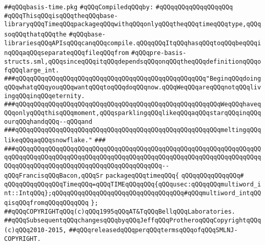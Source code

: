 \label{src/lib/std/types-only/basis-time.pkg}
\verb|##qQQqbasis-time.pkg|\newline
\newline
\verb|#qQQqCompiledqQQqby:|\newline
\verb|#qQQqqQQqqQQqqQQqqQQq|\newline
\newline
\verb|#qQQqThisqQQqisqQQqtheqQQqbase-libraryqQQqTimeqQQqpackageqQQqwithqQQqonlyqQQqtheqQQqtimeqQQqtype,qQQqsoqQQqthatqQQqthe|\newline
\verb|#qQQqbase-librariesqQQqAPIsqQQqcanqQQqcompile.qQQqqQQqItqQQqhasqQQqtoqQQqbeqQQqinqQQqaqQQqseparateqQQqfileqQQqfrom|\newline
\verb|#qQQqpre-basis-structs.sml,qQQqsinceqQQqitqQQqdependsqQQqonqQQqtheqQQqdefinitionqQQqofqQQqlarge_int.|\newline
\newline
\newline
\verb|###qQQqqQQqqQQqqQQqqQQqqQQqqQQqqQQqqQQqqQQqqQQqqQQqqQQq"BeginqQQqdoingqQQqwhatqQQqyouqQQqwantqQQqtoqQQqdoqQQqnow.qQQqWeqQQqareqQQqnotqQQqlivingqQQqinqQQqeternity.|\newline
\verb|###qQQqqQQqqQQqqQQqqQQqqQQqqQQqqQQqqQQqqQQqqQQqqQQqqQQqqQQqWeqQQqhaveqQQqonlyqQQqthisqQQqmoment,qQQqsparklingqQQqlikeqQQqaqQQqstarqQQqinqQQqourqQQqhandqQQq--qQQqand|\newline
\verb|###qQQqqQQqqQQqqQQqqQQqqQQqqQQqqQQqqQQqqQQqqQQqqQQqqQQqqQQqmeltingqQQqlikeqQQqaqQQqsnowflake."|\newline
\verb|###|\newline
\verb|###qQQqqQQqqQQqqQQqqQQqqQQqqQQqqQQqqQQqqQQqqQQqqQQqqQQqqQQqqQQqqQQqqQQqqQQqqQQqqQQqqQQqqQQqqQQqqQQqqQQqqQQqqQQqqQQqqQQqqQQqqQQqqQQqqQQqqQQqqQQqqQQqqQQqqQQqqQQqqQQqqQQqqQQqqQQqqQQqqQQq--qQQqFrancisqQQqBacon,qQQqSr|\newline
\newline
\verb|packageqQQqtimeqQQq{|\newline
\verb|qQQqqQQqqQQqqQQq#|\newline
\verb|qQQqqQQqqQQqqQQqTimeqQQq=qQQqTIMEqQQqqQQq{qQQqusec:qQQqqQQqmultiword_int::IntqQQq};qQQqqQQqqQQqqQQqqQQqqQQqqQQqqQQqqQQq#qQQqmultiword_intqQQqisqQQqfromqQQqqQQqqQQq|\newline
\verb|};|\newline
\newline
\newline
\newline
\verb|##qQQqCOPYRIGHTqQQq(c)qQQq1995qQQqAT&TqQQqBellqQQqLaboratories.|\newline
\verb|##qQQqSubsequentqQQqchangesqQQqbyqQQqJeffqQQqProtheroqQQqCopyrightqQQq(c)qQQq2010-2015,|\newline
\verb|##qQQqreleasedqQQqperqQQqtermsqQQqofqQQqSMLNJ-COPYRIGHT.|\newline


